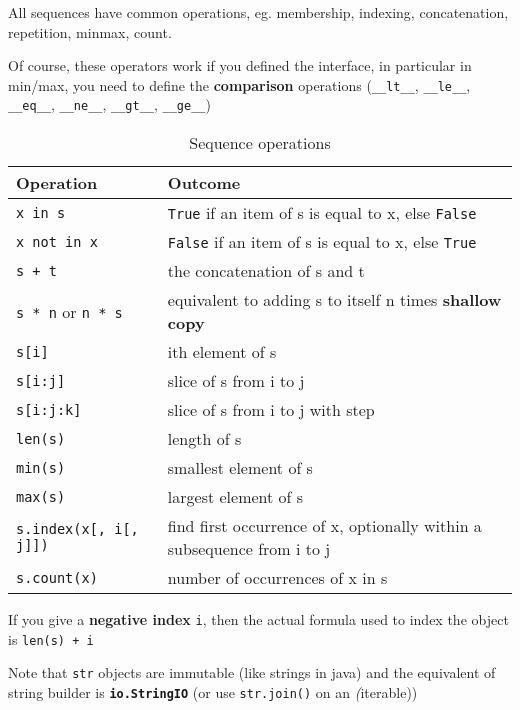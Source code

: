 \documentclass[10pt, openany]{article}
\begin{document}
  All sequences have common operations, eg. membership, indexing, 
  concatenation, repetition, minmax, count.\par
  Of course, these operators work if you defined the interface, in
  particular in min/max, you need to define the \textbf{comparison}
  operations (\texttt{\_\_lt\_\_}, \texttt{\_\_le\_\_}, 
  \texttt{\_\_eq\_\_}, \texttt{\_\_ne\_\_}, \texttt{\_\_gt\_\_}, 
  \texttt{\_\_ge\_\_})
  \begin{table}[t]
    \centering
    \caption{Sequence operations}
    \begin{tabular}{@{}ll@{}}
      \toprule
      \textbf{Operation} & \textbf{Outcome} \\
      \midrule
      \texttt{x in s} & \texttt{True} if an item of s is equal to x,
        else \texttt{False} \\
      \texttt{x not in x} & \texttt{False} if an item of s is equal
        to x, else \texttt{True} \\
      \texttt{s + t} & the concatenation of s and t \\
      \texttt{s * n} or \texttt{n * s} & equivalent to adding s to
        itself n times \textbf{shallow copy}\\
      \texttt{s[i]} & ith element of s \\
      \texttt{s[i:j]} & slice of s from i to j \\
      \texttt{s[i:j:k]} & slice of s from i to j with step \\
      \texttt{len(s)} & length of s \\
      \texttt{min(s)} & smallest element of s \\
      \texttt{max(s)} & largest element of s \\
      \texttt{s.index(x[, i[, j]])} & find first occurrence of x,
        optionally within a subsequence from i to j \\
      \texttt{s.count(x)} & number of occurrences of x in s \\
      \bottomrule
    \end{tabular}
  \end{table}
  If you give a \textbf{negative index} \texttt{i}, then the actual
  formula used to index the object is \texttt{len(s) + i}\par
  Note that \texttt{str} objects are immutable (like strings in java)
  and the equivalent of string builder is 
  \textbf{\texttt{io.StringIO}} (or use \texttt{str.join()} on an 
  \textit(iterable))\par
\end{document}
